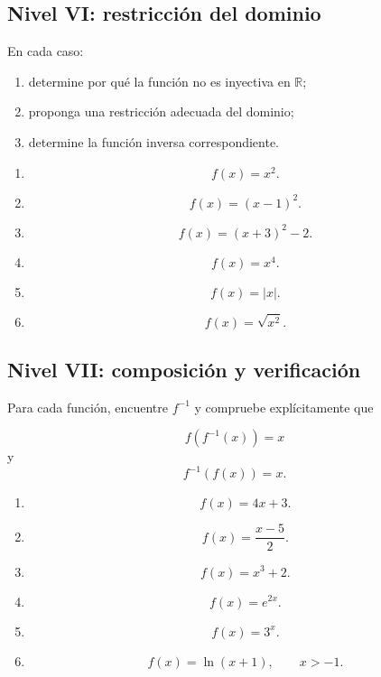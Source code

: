 \documentclass[12pt]{article}
\theoremstyle{remark}
\begin{document}
\subsection{Nivel VI: restricción del dominio}

En cada caso:

\begin{enumerate}
    \item determine por qué la función no es inyectiva en
    \(\mathbb{R}\);
    \item proponga una restricción adecuada del dominio;
    \item determine la función inversa correspondiente.
\end{enumerate}

\begin{enumerate}
    \item
    \[
    f(x)=x^2.
    \]

    \item
    \[
    f(x)=(x-1)^2.
    \]

    \item
    \[
    f(x)=(x+3)^2-2.
    \]

    \item
    \[
    f(x)=x^4.
    \]

    \item
    \[
    f(x)=|x|.
    \]

    \item
    \[
    f(x)=\sqrt{x^2}.
    \]
\end{enumerate}

\subsection{Nivel VII: composición y verificación}

Para cada función, encuentre \(f^{-1}\) y compruebe explícitamente que

\[
f(f^{-1}(x))=x
\]
y
\[
f^{-1}(f(x))=x.
\]

\begin{enumerate}
    \item
    \[
    f(x)=4x+3.
    \]

    \item
    \[
    f(x)=\frac{x-5}{2}.
    \]

    \item
    \[
    f(x)=x^3+2.
    \]

    \item
    \[
    f(x)=e^{2x}.
    \]

    \item
    \[
    f(x)=3^x.
    \]

    \item
    \[
    f(x)=\ln(x+1),
    \qquad x>-1.
    \]
\end{enumerate}
\end{document}
